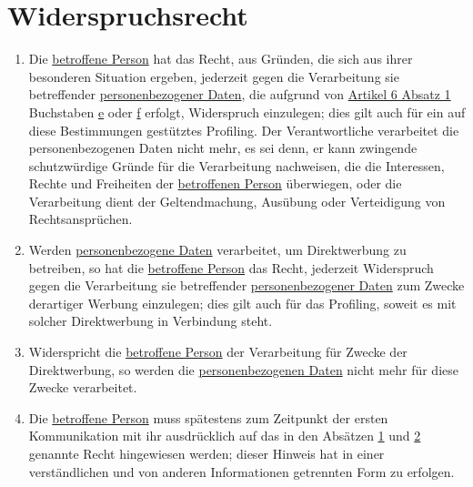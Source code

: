 \chapter{Widerspruchsrecht}
\label{ch:21}


\begin{enumerate}

  \item Die \hyperref[itm:04-1]{betroffene Person} hat das Recht, aus Gründen, die sich aus ihrer besonderen Situation ergeben, jederzeit
   gegen die Verarbeitung sie betreffender \hyperref[itm:04-1]{personenbezogener Daten}, die aufgrund von \hyperref[itm:06-1]{Artikel 6
   Absatz 1} Buchstaben \hyperref[itm:06-1e]{e} oder \hyperref[itm:06-1f]{f} erfolgt, Widerspruch einzulegen; dies gilt
   auch für ein auf diese Bestimmungen gestütztes Profiling. Der Verantwortliche verarbeitet die personenbezogenen
   Daten nicht mehr, es sei denn, er kann zwingende schutzwürdige Gründe für die Verarbeitung nachweisen, die die
   Interessen, Rechte und Freiheiten der \hyperref[itm:04-1]{betroffenen Person} überwiegen, oder die Verarbeitung dient der Geltendmachung,
   Ausübung oder Verteidigung von Rechtsansprüchen.
  \label{itm:21-1}

  \item Werden \hyperref[itm:04-1]{personenbezogene Daten} verarbeitet, um Direktwerbung zu betreiben, so hat die \hyperref[itm:04-1]{betroffene Person} das
   Recht, jederzeit Widerspruch gegen die Verarbeitung sie betreffender \hyperref[itm:04-1]{personenbezogener Daten} zum Zwecke derartiger
   Werbung einzulegen; dies gilt auch für das Profiling, soweit es mit solcher Direktwerbung in Verbindung steht.
  \label{itm:21-2}

  \item Widerspricht die \hyperref[itm:04-1]{betroffene Person} der Verarbeitung für Zwecke der Direktwerbung, so werden die
   \hyperref[itm:04-1]{personenbezogenen Daten} nicht mehr für diese Zwecke verarbeitet.
  \label{itm:21-3}

  \item Die \hyperref[itm:04-1]{betroffene Person} muss spätestens zum Zeitpunkt der ersten Kommunikation mit ihr ausdrücklich auf das in den
   Absätzen \hyperref[itm:21-1]{1} und \hyperref[itm:21-2]{2} genannte Recht hingewiesen werden; dieser Hinweis hat in
   einer verständlichen und von anderen Informationen getrennten Form zu erfolgen.
  \label{itm:21-4}


\end{enumerate}
